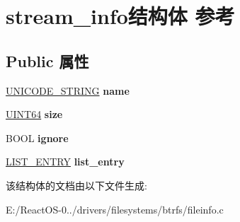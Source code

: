 \hypertarget{structstream__info}{}\section{stream\+\_\+info结构体 参考}
\label{structstream__info}
\subsection*{Public 属性}
\begin{DoxyCompactItemize}
\item 
\mbox{\label{structstream__info_aab483e5bf555d0c22d24414d2771663a}} 
\hyperlink{struct___u_n_i_c_o_d_e___s_t_r_i_n_g}{U\+N\+I\+C\+O\+D\+E\+\_\+\+S\+T\+R\+I\+NG} {\bfseries name}
\item 
\mbox{\label{structstream__info_aa5ed8a55cbe7cf7d3d7aefa480854612}} 
\hyperlink{_processor_bind_8h_a57be03562867144161c1bfee95ca8f7c}{U\+I\+N\+T64} {\bfseries size}
\item 
\mbox{\label{structstream__info_a5baa4210b3affd53537c479cc6e45f2a}} 
B\+O\+OL {\bfseries ignore}
\item 
\mbox{\label{structstream__info_acf9653c950227b03d7df554c9ef9b553}} 
\hyperlink{struct___l_i_s_t___e_n_t_r_y}{L\+I\+S\+T\+\_\+\+E\+N\+T\+RY} {\bfseries list\+\_\+entry}
\end{DoxyCompactItemize}


该结构体的文档由以下文件生成\+:\begin{DoxyCompactItemize}
\item 
E\+:/\+React\+O\+S-\/0../drivers/filesystems/btrfs/fileinfo.\+c\end{DoxyCompactItemize}
